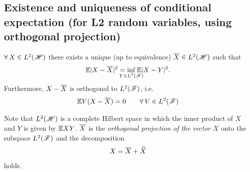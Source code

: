 \documentclass{report}
\begin{document}
\subsection{Existence and uniqueness of conditional expectation (for L2 random variables, using
orthogonal projection)}
\begin{theorem}
	$\forall\, X\in L^{2}(\mathscr{H})$ there exists a unique (up to equivalence) $\overline{X}\in L^{2}(\mathscr{H})$ such that 
	\[\ev|X-\xbar|^{2}=\inf_{\mathclap{Y\in L^{2}(\F)}}\ev|X-Y|^{2}.\]
	Furthermore, $	X-\overline{X}$ is orthogonal to $L^{2}(\mathscr{F})$, i.e.
	\begin{equation*}
		\mathbb{E} V(X-\overline{X})=0\qquad\forall\, V\in L^{2}(\mathscr{F})
	\end{equation*}
\end{theorem}
Note that $L^{2}(\mathscr{H})$ is a complete Hilbert space in which the inner product of $X$ and $Y$ is given by $\mathbb{E} XY$.
$\overline{X}$ is the \emph{orthogonal projection of the vector $X$} onto the subspace $L^{2}(\mathscr{F})$ and the decomposition 
\[X=\overline{X}+\widetilde{X}\]
holds.
\end{document}
